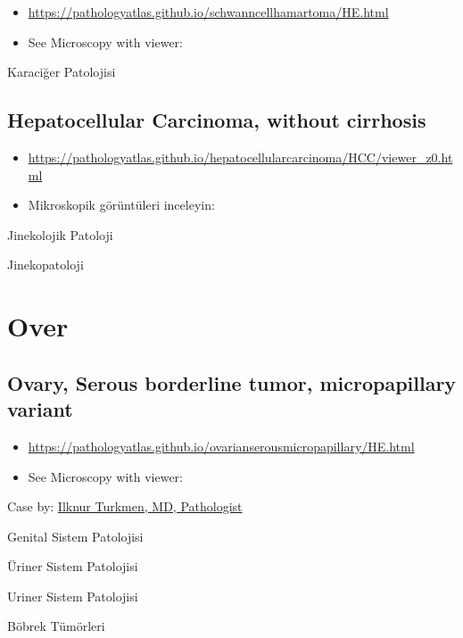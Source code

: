 \documentclass[
  letterpaper,
  DIV=11,
  numbers=noendperiod]{scrreprt}
\begin{document}
\begin{itemize}
\item
  \url{https://pathologyatlas.github.io/schwanncellhamartoma/HE.html}
\item
  See Microscopy with viewer:
\end{itemize}

Karaciğer Patolojisi

\hypertarget{hepatocellular-carcinoma-without-cirrhosis}{%
\section{Hepatocellular Carcinoma, without
cirrhosis}\label{hepatocellular-carcinoma-without-cirrhosis}}

\begin{itemize}
\item
  \url{https://pathologyatlas.github.io/hepatocellularcarcinoma/HCC/viewer_z0.html}
\item
  Mikroskopik görüntüleri inceleyin:
\end{itemize}

Jinekolojik Patoloji

Jinekopatoloji

\hypertarget{over}{%
\chapter{Over}\label{over}}

\hypertarget{ovary-serous-borderline-tumor-micropapillary-variant}{%
\section{Ovary, Serous borderline tumor, micropapillary
variant}\label{ovary-serous-borderline-tumor-micropapillary-variant}}

\begin{itemize}
\item
  \url{https://pathologyatlas.github.io/ovarianserousmicropapillary/HE.html}
\item
  See Microscopy with viewer:
\end{itemize}

Case by:
\href{https://www.memorial.com.tr/en/doctors/ilknur-turkmen-1975}{Ilknur
Turkmen, MD, Pathologist}

Genital Sistem Patolojisi

Üriner Sistem Patolojisi

Uriner Sistem Patolojisi

Böbrek Tümörleri
\end{document}
